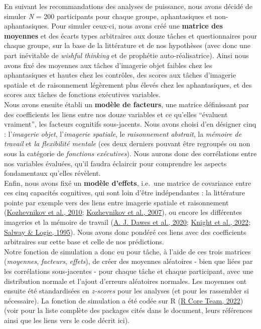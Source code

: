 \documentclass[
  12pt,
]{article}
\begin{document}
En suivant les recommandations des analyses de puissance, nous avons
décidé de simuler \emph{N} = 200 participants pour chaque groupe,
aphantasiques et non-aphantasiques. Pour simuler ceux-ci, nous avons
créé une \textbf{matrice des moyennes} et des écarts types arbitraires
aux douze tâches et questionnaires pour chaque groupe, sur la base de la
littérature et de nos hypothèses (avec donc une part inévitable de
\emph{wishful thinking} et de prophétie auto-réalisatrice). Ainsi nous
avons fixé des moyennes aux tâches d'imagerie objet faibles chez les
aphantasiques et hautes chez les contrôles, des scores aux tâches
d'imagerie spatiale et de raisonnement légèrement plus élevés chez les
aphantasiques, et des scores aux tâches de fonctions exécutives
variables.\\
Nous avons ensuite établi un \textbf{modèle de facteurs}, une matrice
définissant par des coefficients les liens entre nos douze variables et
ce qu'elles ``évaluent vraiment'', les facteurs cognitifs sous-jacents.
Nous avons choisi d'en désigner cinq : l'\emph{imagerie objet},
l'\emph{imagerie spatiale}, le \emph{raisonnement abstrait}, la
\emph{mémoire de travail} et \emph{la flexibilité mentale} (ces deux
derniers pouvant être regroupés ou non sous la catégorie de
\emph{fonctions exécutives}). Nous aurons donc des corrélations entre
nos variables évaluées, qu'il faudra éclaircir pour comprendre les
aspects fondamentaux qu'elles révèlent.\\
Enfin, nous avons fixé un \textbf{modèle d'effets}, i.e.~une matrice de
covariance entre ces cinq capacités cognitives, qui sont loin d'être
indépendantes : la littérature pointe par exemple vers des liens entre
imagerie spatiale et raisonnement
(\protect\hyperlink{ref-kozhevnikovTradeoffObjectSpatial2010}{Kozhevnikov
et al., 2010};
\protect\hyperlink{ref-kozhevnikovSpatialVisualizationPhysics2007}{Kozhevnikov
et al., 2007}), ou encore les différentes imageries et la mémoire de
travail
(\protect\hyperlink{ref-dawesCognitiveProfileMultisensory2020}{A. J.
Dawes et al., 2020};
\protect\hyperlink{ref-knightMemoryImageryNo2022}{Knight et al., 2022};
\protect\hyperlink{ref-salwayVisuospatialWorkingMemory1995}{Salway \&
Logie, 1995}). Nous avons donc pondéré ces liens avec des coefficients
arbitraires sur cette base et celle de nos prédictions.\\
Notre fonction de simulation a donc eu pour tâche, à l'aide de ces trois
matrices (\emph{moyennes}, \emph{facteurs}, \emph{effets}), de créer des
moyennes aléatoires - bien que liées par les corrélations sous-jacentes
- pour chaque tâche et chaque participant, avec une distribution normale
et l'ajout d'erreurs aléatoires normales. Les moyennes ont ensuite été
standardisées en \emph{z-scores} pour les analyses (et pour les
rassembler si nécessaire). La fonction de simulation a été codée sur R
(\protect\hyperlink{ref-R-base}{R Core Team, 2022}) (voir
\emph{} pour la liste complète des packages cités dans
le document, leurs références ainsi que les liens vers le code décrit
ici).
\end{document}
